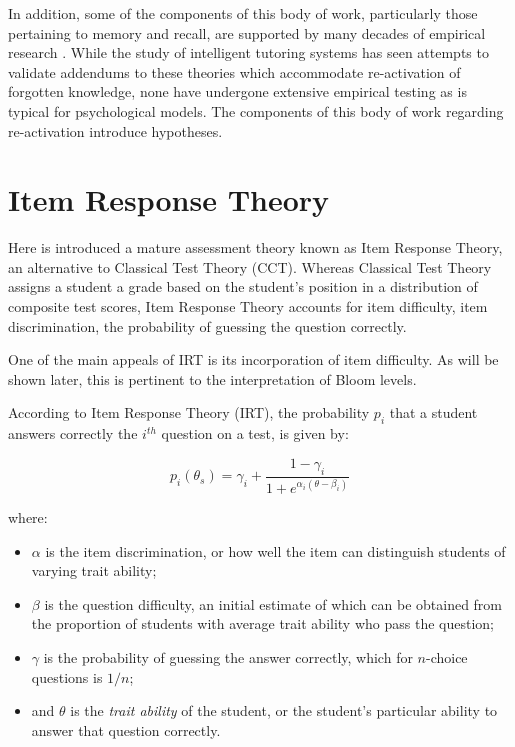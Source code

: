In addition, some of the components of this body of work, particularly those
pertaining to memory and recall, are supported by many decades of empirical
research \cite{ebbinghaus}.  While the study of intelligent tutoring systems
has seen attempts to validate addendums to these theories which accommodate
re-activation of forgotten knowledge, none have undergone extensive empirical
testing as is typical for psychological models.  The components of this body of
work regarding re-activation introduce hypotheses.


\section{Item Response Theory}

Here is introduced a mature assessment theory known as Item Response Theory, an
alternative to Classical Test Theory (CCT).  Whereas Classical Test Theory
assigns a student a grade based on the student's position in a distribution of
composite test scores, Item Response Theory accounts for item difficulty, item
discrimination, the probability of guessing the question correctly.

One of the main appeals of IRT is its incorporation of item difficulty.  As
will be shown later, this is pertinent to the interpretation of Bloom levels.  

According to Item Response Theory (IRT), the probability $p_i$ that a student
answers correctly the $i^{th}$ question on a test, is given by:

\begin{equation}
 \label{eq:irt}
  p_i(\theta_s) = \gamma_i + \frac{1-\gamma_i}{1+e^{\alpha_i(\theta-\beta_i)}}
\end{equation}

where:

\begin{itemize} 

 \item $\alpha$ is the item discrimination, or how well the item can
 distinguish students of varying trait ability;

 \item $\beta$ is the question difficulty, an initial estimate of which can be
 obtained from the proportion of students with average trait ability who pass
 the question;

 \item $\gamma$ is the probability of guessing the answer correctly,
 which for $n$-choice questions is $1/n$;

 \item and $\theta$ is the \emph{trait ability} of the student, or the
 student's particular ability to answer that question correctly.

\end{itemize} 

